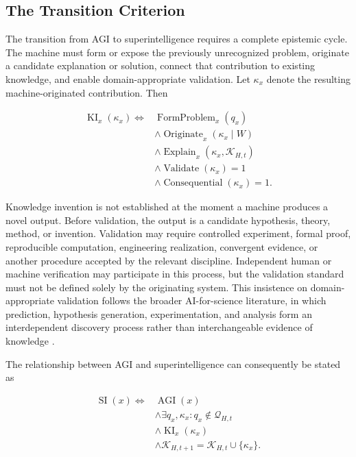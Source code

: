 \subsection{\textbf{The Transition Criterion}}

The transition from AGI to superintelligence requires a complete epistemic
cycle. The machine must form or expose the previously unrecognized problem,
originate a candidate explanation or solution, connect that contribution to
existing knowledge, and enable domain-appropriate validation. Let
$\kappa_x$ denote the resulting machine-originated contribution. Then

\begin{equation}
\begin{aligned}
\operatorname{KI}_{x}(\kappa_x)
\Longleftrightarrow{}&
\operatorname{FormProblem}_{x}(q_x)\\
&\land \operatorname{Originate}_{x}(\kappa_x\mid W)\\
&\land \operatorname{Explain}_{x}
(\kappa_x,\mathcal{K}_{H,t})\\
&\land \operatorname{Validate}(\kappa_x)=1\\
&\land \operatorname{Consequential}(\kappa_x)=1.
\end{aligned}
\label{eq:knowledge_invention_cycle}
\end{equation}

Knowledge invention is not established at the moment a machine produces a
novel output. Before validation, the output is a candidate hypothesis, theory,
method, or invention. Validation may require controlled experiment, formal
proof, reproducible computation, engineering realization, convergent evidence,
or another procedure accepted by the relevant discipline. Independent human or
machine verification may participate in this process, but the validation
standard must not be defined solely by the originating system. This insistence
on domain-appropriate validation follows the broader AI-for-science literature,
in which prediction, hypothesis generation, experimentation, and analysis form
an interdependent discovery process rather than interchangeable evidence of
knowledge \cite{wang2023scientific}.

The relationship between AGI and superintelligence can consequently be stated
as

\begin{equation}
\begin{aligned}
\operatorname{SI}(x)
\Longleftrightarrow{}&
\operatorname{AGI}(x)\\
&\land \exists q_x,\kappa_x:
q_x\notin\mathcal{Q}_{H,t}\\
&\land \operatorname{KI}_{x}(\kappa_x)\\
&\land
\mathcal{K}_{H,t+1}
=\mathcal{K}_{H,t}\cup\{\kappa_x\}.
\end{aligned}
\label{eq:si_transition}
\end{equation}

